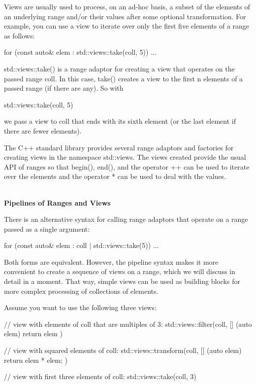 Views are usually used to process, on an ad-hoc basis, a subset of the elements of an underlying range and/or their values after some optional transformation. For example, you can use a view to iterate over only the first five elements of a range as follows:

\begin{cpp}
for (const auto& elem : std::views::take(coll, 5)) {
	...
}
\end{cpp}

std::views::take() is a range adaptor for creating a view that operates on the passed range coll. In this case, take() creates a view to the first n elements of a passed range (if there are any). So with

\begin{cpp}
std::views::take(coll, 5)
\end{cpp}

we pass a view to coll that ends with its sixth element (or the last element if there are fewer elements).

The C++ standard library provides several range adaptors and factories for creating views in the namespace std::views. The views created provide the usual API of ranges so that begin(), end(), and the operator ++ can be used to iterate over the elements and the operator * can be used to deal with the values.

\noindent
\hspace*{\fill} \\ %
\textbf{Pipelines of Ranges and Views}

There is an alternative syntax for calling range adaptors that operate on a range passed as a single argument:

\begin{cpp}
for (const auto& elem : coll | std::views::take(5)) {
	...
}
\end{cpp}

Both forms are equivalent. However, the pipeline syntax makes it more convenient to create a sequence of views on a range, which we will discuss in detail in a moment. That way, simple views can be used as building blocks for more complex processing of collections of elements.

Assume you want to use the following three views:

\begin{cpp}
// view with elements of coll that are multiples of 3:
std::views::filter(coll, [] (auto elem) {
	return elem %
})

// view with squared elements of coll:
std::views::transform(coll, [] (auto elem) {
	return elem * elem;
})

// view with first three elements of coll:
std::views::take(coll, 3)
\end{cpp}

